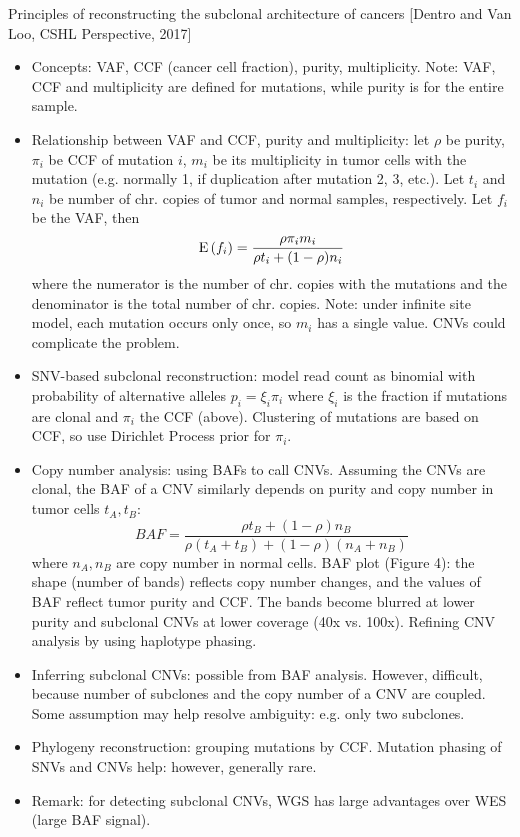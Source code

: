 \documentclass{report}
\begin{document}
Principles of reconstructing the subclonal architecture of cancers [Dentro and Van Loo, CSHL Perspective, 2017]
\begin{itemize}
	\item Concepts: VAF, CCF (cancer cell fraction), purity, multiplicity. Note: VAF, CCF and multiplicity are defined for mutations, while purity is for the entire sample. 
	
	\item Relationship between VAF and CCF, purity and multiplicity: let $\rho$ be purity, $\pi_i$ be CCF of mutation $i$, $m_i$ be its multiplicity in tumor cells with the mutation (e.g. normally 1, if duplication after mutation 2, 3, etc.). Let $t_i$ and $n_i$ be number of chr. copies of tumor and normal samples, respectively. Let $f_i$ be the VAF, then
	\begin{equation}
	{\rm E}\,(f_i) = \frac{\rho \pi_i m_i}{\rho t_i + (1-\rho) n_i}
	\end{equation}
	where the numerator is the number of chr. copies with the mutations and the denominator is the total number of chr. copies. Note: under infinite site model, each mutation occurs only once, so $m_i$ has a single value. CNVs could complicate the problem. 
	
	\item SNV-based subclonal reconstruction: model read count as binomial with probability of alternative alleles $p_i = \xi_i \pi_i$ where $\xi_i$ is the fraction if mutations are clonal and $\pi_i$ the CCF (above). Clustering of mutations are based on CCF, so use Dirichlet Process prior for $\pi_i$. 
	
	\item Copy number analysis: using BAFs to call CNVs. Assuming the CNVs are clonal, the BAF of a CNV similarly depends on purity and copy number in tumor cells $t_A, t_B$: 
	\begin{equation}
	BAF = \frac{\rho t_B + (1-\rho) n_B}{\rho (t_A + t_B) + (1-\rho) (n_A + n_B)}
	\end{equation}
	where $n_A, n_B$ are copy number in normal cells. BAF plot (Figure 4): the shape (number of bands) reflects copy number changes, and the values of BAF reflect tumor purity and CCF. The bands become blurred at lower purity and subclonal CNVs at lower coverage (40x vs. 100x). Refining CNV analysis by using haplotype phasing. 
	
	\item Inferring subclonal CNVs: possible from BAF analysis. However, difficult, because number of subclones and the copy number of a CNV are coupled. Some assumption may help resolve ambiguity: e.g. only two subclones.  
	
	\item Phylogeny reconstruction: grouping mutations by CCF. Mutation phasing of SNVs and CNVs help: however, generally rare. 
	
	\item Remark: for detecting subclonal CNVs, WGS has large advantages over WES (large BAF signal). 
\end{itemize}
\end{document}
